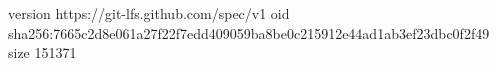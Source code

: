 version https://git-lfs.github.com/spec/v1
oid sha256:7665c2d8e061a27f22f7edd409059ba8be0c215912e44ad1ab3ef23dbc0f2f49
size 151371
